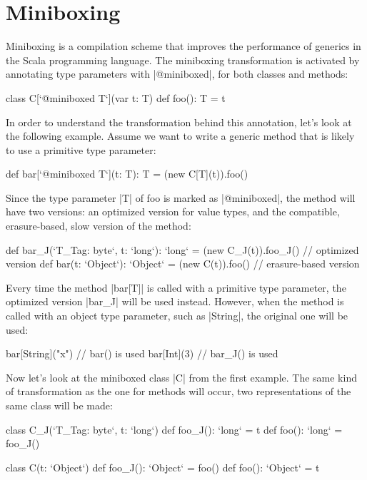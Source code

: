 \section{Miniboxing}

Miniboxing\cite{miniboxing-www} is a compilation scheme that improves the performance of generics in the Scala programming language. The miniboxing transformation is activated by annotating type parameters with |@miniboxed|, for both classes and methods:

\begin{lstlisting-nobreak}
class C[`@miniboxed T`](var t: T) {
  def foo(): T = t
}
\end{lstlisting-nobreak}

In order to understand the transformation behind this annotation, let's look at the following example. Assume we want to write a generic method that is likely to use a primitive type parameter:

\begin{lstlisting-nobreak}
def bar[`@miniboxed T`](t: T): T =
  (new C[T](t)).foo()
\end{lstlisting-nobreak}

Since the type parameter |T| of foo is marked as |@miniboxed|, the method will have two versions: an optimized version for value types, and the compatible, erasure-based, slow version of the method:

\begin{lstlisting-nobreak}
def bar_J(`T_Tag: byte`, t: `long`): `long` =
  (new C_J(t)).foo_J()   // optimized version
def bar(t: `Object`): `Object` =
  (new C(t)).foo()   // erasure-based version
\end{lstlisting-nobreak}

Every time the method |bar[T]| is called with a primitive type parameter, the optimized version |bar_J| will be used instead. However, when the method is called with an object type parameter, such as |String|, the original one will be used:

\begin{lstlisting-nobreak}
bar[String]("x")  // bar() is used
bar[Int](3)           // bar_J() is used
\end{lstlisting-nobreak}

Now let's look at the miniboxed class |C| from the first example. The same kind of transformation as the one for methods will occur, two representations of the same class will be made:

\begin{lstlisting-nobreak}
class C_J(`T_Tag: byte`, t: `long`) {
  def foo_J(): `long` = t
  def foo(): `long` = foo_J()
}

class C(t: `Object`) {
  def foo_J(): `Object` = foo()
  def foo(): `Object` = t
}
\end{lstlisting-nobreak}

